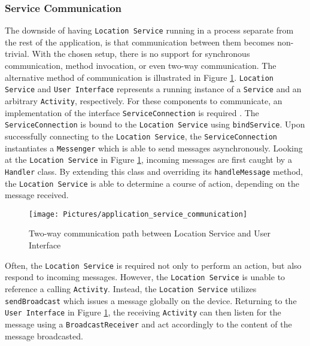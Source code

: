 \subsubsection{Service Communication}\label{subsubsec:service_communication}
The downside of having \texttt{Location Service} running in a process separate from the rest of the application, is that communication between them becomes non-trivial. With the chosen setup, there is no support for synchronous communication, method invocation, or even two-way communication. The alternative method of communication is illustrated in Figure \ref{fig:application_service_communication}. \texttt{Location Service} and \texttt{User Interface} represents a running instance of a \texttt{Service} and an arbitrary \texttt{Activity}, respectively. For these components to communicate, an implementation of the interface \texttt{ServiceConnection} is required \citep{android_serviceconnection}.  The \texttt{ServiceConnection} is bound to the \texttt{Location Service} using \texttt{bindService}\citep{android_bindservice}. Upon successfully connecting to the \texttt{Location Service}, the \texttt{ServiceConnection} instantiates a \texttt{Messenger}\citep{android_messenger} which is able to send messages asynchronously. Looking at the \texttt{Location Service} in Figure \ref{fig:application_service_communication}, incoming messages are first caught by a \texttt{Handler} \citep{android_handler} class. By extending this class and overriding its \texttt{handleMessage} method, the \texttt{Location Service} is able to determine a course of action, depending on the message received.

\begin{figure}[tb]
\centering
\texttt{[image: Pictures/application\_service\_communication]}
\caption{Two-way communication path between Location Service and User Interface}
\label{fig:application_service_communication}
\end{figure}

Often, the \texttt{Location Service} is required not only to perform an action, but also respond to incoming messages. However, the \texttt{Location Service} is  unable to reference a calling \texttt{Activity}. Instead, the \texttt{Location Service} utilizes \texttt{sendBroadcast} \citep{android_sendbroadcast} which issues a message globally on the device. Returning to the \texttt{User Interface} in Figure \ref{fig:application_service_communication}, the receiving \texttt{Activity} can then listen for the message using a \texttt{BroadcastReceiver} \citep{android_broadcastreceiver} and act accordingly to the content of the message broadcasted. 

